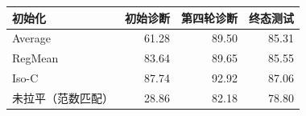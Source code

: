 \begin{tabular}{lrrr}
\toprule
初始化 & 初始诊断 & 第四轮诊断 & 终态测试 \\
\midrule
Average & 61.28 & 89.50 & 85.31 \\
RegMean & 83.64 & 89.65 & 85.55 \\
Iso-C & 87.74 & 92.92 & 87.06 \\
未拉平（范数匹配） & 28.86 & 82.18 & 78.80 \\
\bottomrule
\end{tabular}
